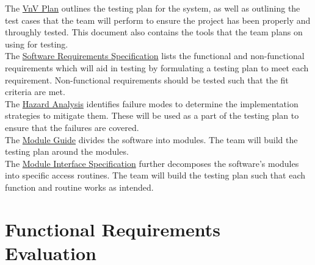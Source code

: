 \documentclass[12pt, titlepage]{article}
\begin{document}
\noindent The \href{https://github.com/stanreee/sign-language-learning/blob/main/docs/VnVPlan/VnVPlan.pdf}{VnV Plan} outlines the testing plan for the system, as well as outlining the test cases that the team will perform to ensure the project has been properly and throughly tested. This document also contains the tools that the team plans on using for testing.\\

\noindent The \href{https://github.com/stanreee/sign-language-learning/blob/main/docs/SRS/SRS.pdf}{Software Requirements Specification} lists the functional and non-functional requirements which will aid in testing by formulating a testing plan to meet each requirement. Non-functional requirements should be tested such that the fit criteria are met.\\

\noindent The \href{https://github.com/stanreee/sign-language-learning/blob/main/docs/HazardAnalysis/HazardAnalysis.pdf}{Hazard Analysis} identifies failure modes to determine the implementation strategies to mitigate them. These will be used as a part of the testing plan to ensure that the failures are covered.\\

\noindent The \href{https://github.com/stanreee/sign-language-learning/blob/main/docs/Design/SoftArchitecture/MG.pdf}{Module Guide} divides the software into modules. The team will build the testing plan around the modules.\\

\noindent The \href{https://github.com/stanreee/sign-language-learning/blob/main/docs/Design/SoftDetailedDes/MIS.pdf}{Module Interface Specification} further decomposes the software's modules into specific access routines. The team will build the testing plan such that each function and routine works as intended.

\section{Functional Requirements Evaluation}
\end{document}
